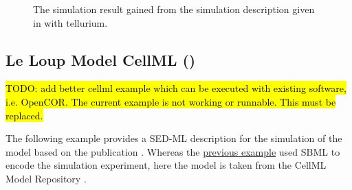 \begin{figure}[ht]
\begin{minipage}{0.45\textwidth}
        \caption{The simulation result gained from the simulation description given in  with tellurium.}
    \end{minipage}
    \label{fig:leloup-sbml}
\end{figure}



\subsection{Le Loup Model CellML ()}
\label{example:leloup_cellml}

\hl{TODO: add better cellml example which can be executed with existing software, i.e. OpenCOR. The current example is not working or runnable. This must be replaced.}

The following example provides a SED-ML description for the simulation of the model based on the publication \citep{LeLoup1999}. Whereas the \hyperref[example:leloup_sbml]{previous example} used SBML to encode the simulation experiment, here the model is taken from the CellML Model Repository \citep{LLH+08}.



